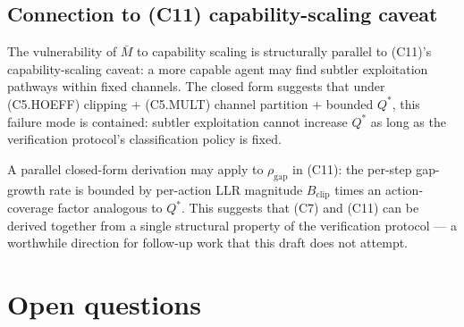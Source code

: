 \documentclass{article}
\newcommand{\Bclip}{B_{\mathrm{clip}}}
\newcommand{\rhogap}{\rho_{\mathrm{gap}}}
\begin{document}
\subsection{Connection to (C11) capability-scaling caveat}

The vulnerability of $\bar{M}$ to capability scaling is
structurally parallel to (C11)'s capability-scaling caveat: a more
capable agent may find subtler exploitation pathways within fixed
channels.  The closed form suggests that under (C5.HOEFF) clipping
+ (C5.MULT) channel partition + bounded $Q^*$, this failure mode
is contained: subtler exploitation cannot increase $Q^*$ as long
as the verification protocol's classification policy is fixed.

A parallel closed-form derivation may apply to $\rhogap$ in (C11):
the per-step gap-growth rate is bounded by per-action LLR magnitude
$\Bclip$ times an action-coverage factor analogous to $Q^*$.  This
suggests that (C7) and (C11) can be derived together from a single
structural property of the verification protocol --- a worthwhile
direction for follow-up work that this draft does not attempt.

\section{Open questions}
\end{document}

